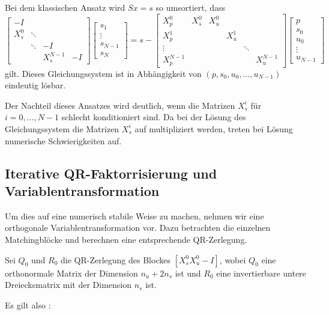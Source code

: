 Bei dem klassischen Ansatz wird $Sx=s$ so umsortiert, dass 
$$\left[\begin{array}{cccc}
-I &  &  &  \\ 
X_s^0 & \ddots &  &  \\ 
 & \ddots & -I &  \\ 
 &  & X_s^{N-1} & -I
\end{array} \right]\left[\begin{array}{c}
s_1 \\ 
\vdots \\ 
s_{N-1} \\ 
s_{N}
\end{array}  \right]=s-
\left[\begin{array}{cccccc}
X_p^0 & X_s^0 & X_u^0 &  &  &  \\ 
X_p^1 &  &  & X_u^1 &  &  \\ 
\vdots &  &  &  & \ddots &  \\ 
X_p^{N-1} &  &  &  &  & X_u^{N-1}
\end{array} 
\right]
\left[\begin{array}{c}
p \\
s_ 0 \\
u_0\\
\vdots \\
u_{N-1}
\end{array}\right]$$ 
gilt. Dieses Gleichungssystem ist in Abhängigkeit von $(p,s_0,u_0,\hdots, u_{N-1})$ eindeutig lösbar.

Der Nachteil dieses Ansatzes wird deutlich, wenn die Matrizen $X_s^i$ für $i=0,...,N-1$ schlecht konditioniert sind. Da bei der Lösung des Gleichungssystem die Matrizen $X_s^i$ auf multipliziert werden, treten bei Lösung numerische Schwierigkeiten auf.

\subsection{ Iterative QR-Faktorrisierung und Variablentransformation} 
Um dies auf eine numerisch stabile Weise zu machen, nehmen wir eine orthogonale Variablentransformation vor. Dazu betrachten die einzelnen Matchingblöcke und berechnen eine entsprechende QR-Zerlegung. 

Sei $Q_0$ und $R_0$ die QR-Zerlegung des Blockes $[X_s^0 X_u^0 -I]$, wobei $Q_0$ eine orthonormale Matrix der Dimension $n_u+2n_s$ ist und $R_0$ eine invertierbare untere Dreiecksmatrix mit der Dimension $n_s$ ist.

Es gilt also :

